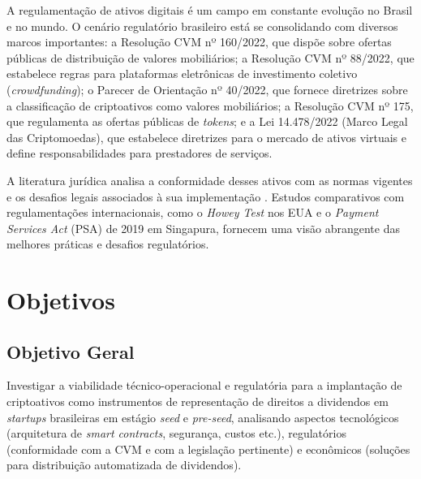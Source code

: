 \documentclass[12pt, a4paper, oneside, openright, chapter=TITLE]{abntex2}
\begin{document}
A regulamentação de ativos digitais é um campo em constante evolução no Brasil e no mundo. O cenário regulatório brasileiro está se consolidando com diversos marcos importantes: a Resolução CVM nº 160/2022, que dispõe sobre ofertas públicas de distribuição de valores mobiliários; a Resolução CVM nº 88/2022, que estabelece regras para plataformas eletrônicas de investimento coletivo (\textit{crowdfunding}); o Parecer de Orientação nº 40/2022, que fornece diretrizes sobre a classificação de criptoativos como valores mobiliários; a Resolução CVM nº 175, que regulamenta as ofertas públicas de \textit{tokens}; e a Lei 14.478/2022 (Marco Legal das Criptomoedas), que estabelece diretrizes para o mercado de ativos virtuais e define responsabilidades para prestadores de serviços. 

A literatura jurídica analisa a conformidade desses ativos com as normas vigentes \cite{dias2020} e os desafios legais associados à sua implementação \cite{barreto2022}. Estudos comparativos com regulamentações internacionais, como o \textit{Howey Test} nos EUA e o \textit{Payment Services Act} (PSA) de 2019 em Singapura, fornecem uma visão abrangente das melhores práticas e desafios regulatórios.

\clearpage
\section{Objetivos}
\subsection{Objetivo Geral}

\hspace*{\parindent} Investigar a viabilidade técnico-operacional e regulatória para a implantação de criptoativos como instrumentos de representação de direitos a dividendos em \textit{startups} brasileiras em estágio \textit{seed} e \textit{pre-seed}, analisando aspectos tecnológicos (arquitetura de \textit{smart contracts}, segurança, custos etc.), regulatórios (conformidade com a CVM e com a legislação pertinente) e econômicos (soluções para distribuição automatizada de dividendos).
\end{document}
